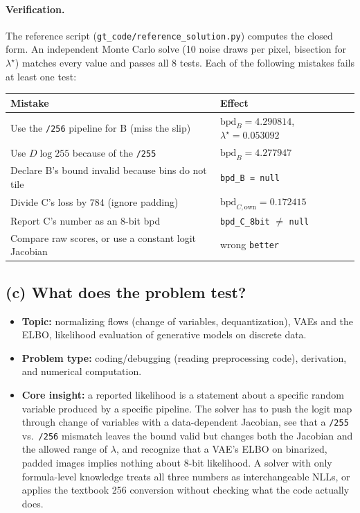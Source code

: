 \documentclass[11pt]{article}
\begin{document}
\paragraph{Verification.} The reference script
(\texttt{gt\_code/reference\_solution.py}) computes
the closed form. An independent Monte Carlo solve (10 noise draws per pixel,
bisection for \(\lambda^\star\)) matches every value and passes all 8 tests.
Each of the following mistakes fails at least one test:
\begin{center}
\begin{tabular}{@{}ll@{}}
\toprule
Mistake & Effect\\
\midrule
Use the \texttt{/256} pipeline for B (miss the slip) & \(\mathrm{bpd}_B=4.290814\), \(\lambda^\star=0.053092\)\\
Use \(D\log255\) because of the \texttt{/255} & \(\mathrm{bpd}_B=4.277947\)\\
Declare B's bound invalid because bins do not tile & \texttt{bpd\_B = null}\\
Divide C's loss by 784 (ignore padding) & \(\mathrm{bpd}_{C,\text{own}}=0.172415\)\\
Report C's number as an 8-bit bpd & \texttt{bpd\_C\_8bit} \(\ne\) \texttt{null}\\
Compare raw scores, or use a constant logit Jacobian & wrong \texttt{better}\\
\bottomrule
\end{tabular}
\end{center}

\subsection{(c) What does the problem test?}

\begin{itemize}
  \item \textbf{Topic:} normalizing flows (change of variables,
        dequantization), VAEs and the ELBO, likelihood evaluation of
        generative models on discrete data.
  \item \textbf{Problem type:} coding/debugging (reading preprocessing code),
        derivation, and numerical computation.
  \item \textbf{Core insight:} a reported likelihood is a statement about a
        specific random variable produced by a specific pipeline. The solver
        has to push the logit map through change of variables with a
        data-dependent Jacobian, see that a \texttt{/255} vs.\ \texttt{/256}
        mismatch leaves the bound valid but changes both the Jacobian and
        the allowed range of \(\lambda\), and recognize that a VAE's ELBO on
        binarized, padded images implies nothing about 8-bit likelihood. A
        solver with only formula-level knowledge treats all three numbers as
        interchangeable NLLs, or applies the textbook 256 conversion without
        checking what the code actually does.
\end{itemize}
\end{document}
